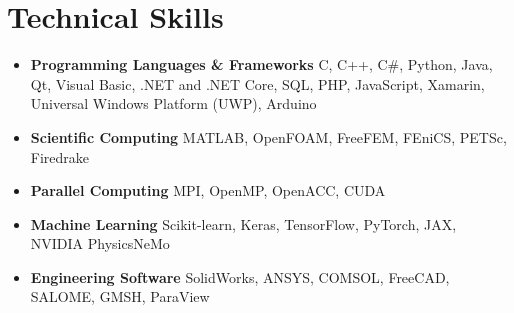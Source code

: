 \documentclass{cv}
\begin{document}
\section{Technical Skills}

\begin{itemize}[itemsep=-0.2ex]

\item
\textbf{Programming Languages \& Frameworks}  C, C++, C\#, Python, Java, Qt, Visual Basic, .NET and .NET Core, SQL, PHP, JavaScript, Xamarin, Universal Windows Platform (UWP), Arduino
\item
\textbf{Scientific Computing}  MATLAB, OpenFOAM, FreeFEM, FEniCS, PETSc, Firedrake
\item 
\textbf{Parallel Computing} MPI, OpenMP, OpenACC, CUDA
\item
\textbf{Machine Learning} Scikit-learn, Keras, TensorFlow, PyTorch, JAX, NVIDIA PhysicsNeMo
\item
\textbf{Engineering Software} SolidWorks, ANSYS, COMSOL, FreeCAD, SALOME, GMSH, ParaView

\end{itemize}
\end{document}

